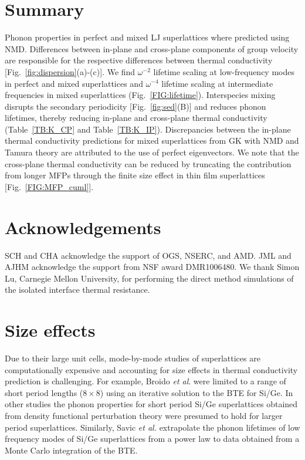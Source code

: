 \documentclass[aps,prb,preprint,preprintnumbers,amsmath,amssymb,floatfix,superscriptaddress]{revtex4}
\begin{document}

\section{Summary}

Phonon properties in perfect and mixed LJ superlattices where predicted using NMD. Differences between in-plane and cross-plane components of group velocity are responsible for the respective differences between thermal conductivity [Fig.~\ref{fig:dispersion}(a)-(c)]. We find $\omega^{-2}$ lifetime scaling at low-frequency modes in perfect and mixed superlattices and $\omega^{-4}$  lifetime scaling at intermediate frequencies in mixed superlattices (Fig.~\ref{FIG:lifetime}). Interspecies mixing disrupts the secondary periodicity [Fig.~\ref{fig:sed}(B)] and reduces phonon lifetimes, thereby reducing in-plane and cross-plane thermal conductivity (Table~\ref{TB:K_CP} and Table~\ref{TB:K_IP}). Discrepancies between the in-plane thermal conductivity predictions for mixed superlattices from GK with NMD and Tamura theory are attributed to the use of perfect eigenvectors. We note that the cross-plane thermal conductivity can be reduced by truncating the contribution from longer MFPs through the finite size effect in thin film superlattices [Fig.~\ref{FIG:MFP_cuml}].

\section{Acknowledgements}
SCH and CHA acknowledge the support of OGS, NSERC, and AMD. JML and AJHM acknowledge the support from NSF award DMR1006480. We thank Simon Lu, Carnegie Mellon University, for performing the direct method simulations of the isolated interface thermal resistance.

\newpage
\appendix
\section{Size effects}\label{app:size effects}
Due to their large unit cells, mode-by-mode studies of superlattices are computationally expensive and accounting for size effects in thermal conductivity prediction is challenging. For example, Broido \textit{et al}. were limited to a range of short period lengths ($8\times 8$) using an iterative solution to the BTE for Si/Ge.\cite {PhysRevB.70.081310} In other studies the phonon properties for short period Si/Ge superlattices obtained from density functional perturbation theory were presumed to hold for larger period superlattices.\cite{Luckyanova16112012, doi:10.1021/nl202186y} Similarly, Savic \textit{et al.} extrapolate the phonon lifetimes of low frequency modes of Si/Ge superlattices from a power law to data obtained from a Monte Carlo integration of the BTE.\cite{savic:073113} 
\end{document}

